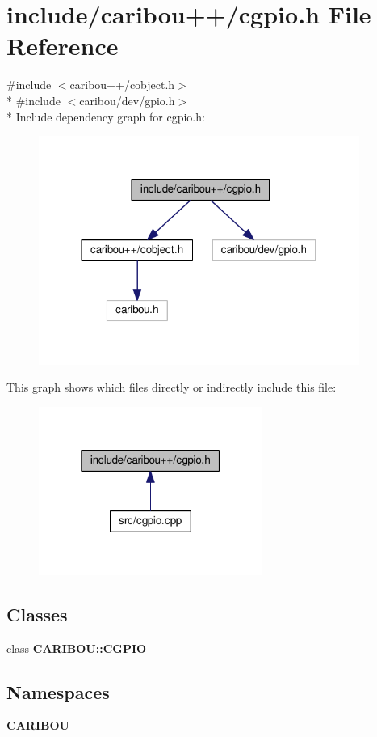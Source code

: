 \section{include/caribou++/cgpio.h File Reference}
\label{cgpio_8h}
{\ttfamily \#include $<$caribou++/cobject.\+h$>$}\\*
{\ttfamily \#include $<$caribou/dev/gpio.\+h$>$}\\*
Include dependency graph for cgpio.\+h\+:
\nopagebreak
\begin{figure}[H]
\begin{center}
\leavevmode
\includegraphics[width=298pt]{cgpio_8h__incl}
\end{center}
\end{figure}
This graph shows which files directly or indirectly include this file\+:
\nopagebreak
\begin{figure}[H]
\begin{center}
\leavevmode
\includegraphics[width=208pt]{cgpio_8h__dep__incl}
\end{center}
\end{figure}
\subsection*{Classes}
\begin{DoxyCompactItemize}
\item 
class {\bf C\+A\+R\+I\+B\+O\+U\+::\+C\+G\+P\+IO}
\end{DoxyCompactItemize}
\subsection*{Namespaces}
\begin{DoxyCompactItemize}
\item 
 {\bf C\+A\+R\+I\+B\+OU}
\end{DoxyCompactItemize}
